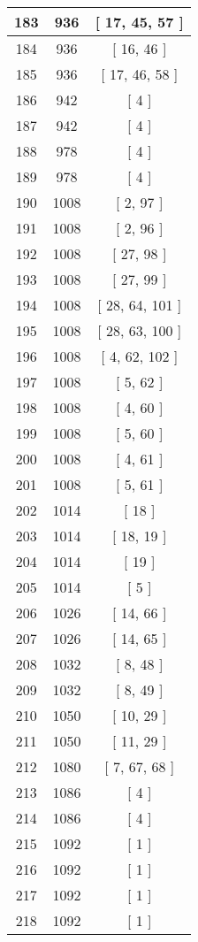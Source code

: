 \begin{center}
\begin{longtable}[H]{|| c c c ||}
\hline
183 & 936 & [ 17, 45, 57 ] \\ 
\hline
184 & 936 & [ 16, 46 ] \\ 
\hline
185 & 936 & [ 17, 46, 58 ] \\ 
\hline
186 & 942 & [ 4 ] \\ 
\hline
187 & 942 & [ 4 ] \\ 
\hline
188 & 978 & [ 4 ] \\ 
\hline
189 & 978 & [ 4 ] \\ 
\hline
190 & 1008 & [ 2, 97 ] \\ 
\hline
191 & 1008 & [ 2, 96 ] \\ 
\hline
192 & 1008 & [ 27, 98 ] \\ 
\hline
193 & 1008 & [ 27, 99 ] \\ 
\hline
194 & 1008 & [ 28, 64, 101 ] \\ 
\hline
195 & 1008 & [ 28, 63, 100 ] \\ 
\hline
196 & 1008 & [ 4, 62, 102 ] \\ 
\hline
197 & 1008 & [ 5, 62 ] \\ 
\hline
198 & 1008 & [ 4, 60 ] \\ 
\hline
199 & 1008 & [ 5, 60 ] \\ 
\hline
200 & 1008 & [ 4, 61 ] \\ 
\hline
201 & 1008 & [ 5, 61 ] \\ 
\hline
202 & 1014 & [ 18 ] \\ 
\hline
203 & 1014 & [ 18, 19 ] \\ 
\hline
204 & 1014 & [ 19 ] \\ 
\hline
205 & 1014 & [ 5 ] \\ 
\hline
206 & 1026 & [ 14, 66 ] \\ 
\hline
207 & 1026 & [ 14, 65 ] \\ 
\hline
208 & 1032 & [ 8, 48 ] \\ 
\hline
209 & 1032 & [ 8, 49 ] \\ 
\hline
210 & 1050 & [ 10, 29 ] \\ 
\hline
211 & 1050 & [ 11, 29 ] \\ 
\hline
212 & 1080 & [ 7, 67, 68 ] \\ 
\hline
213 & 1086 & [ 4 ] \\ 
\hline
214 & 1086 & [ 4 ] \\ 
\hline
215 & 1092 & [ 1 ] \\ 
\hline
216 & 1092 & [ 1 ] \\ 
\hline
217 & 1092 & [ 1 ] \\ 
\hline
218 & 1092 & [ 1 ] \\ 

\end{longtable}
\end{center}
